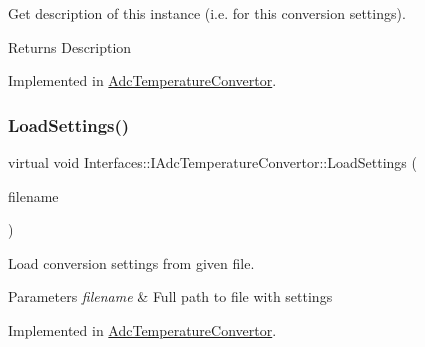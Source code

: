 Get description of this instance (i.\+e. for this conversion settings). 

\begin{DoxyReturn}{Returns}
Description 
\end{DoxyReturn}


Implemented in \hyperlink{class_adc_temperature_convertor_ad82afdddbac46a95b6da44e769180d10}{Adc\+Temperature\+Convertor}.

\mbox{\label{class_interfaces_1_1_i_adc_temperature_convertor_a9697a0319f82ebd1fc20f5e24d3b191c}} 
\subsubsection{\texorpdfstring{Load\+Settings()}{LoadSettings()}}
{\footnotesize\ttfamily virtual void Interfaces\+::\+I\+Adc\+Temperature\+Convertor\+::\+Load\+Settings (\begin{DoxyParamCaption}\item[{Q\+String}]{filename }\end{DoxyParamCaption})\hspace{0.3cm}{\ttfamily [pure virtual]}}



Load conversion settings from given file. 


\begin{DoxyParams}{Parameters}
{\em filename} & Full path to file with settings \\
\hline
\end{DoxyParams}


Implemented in \hyperlink{class_adc_temperature_convertor_affab0a66a3508e2eedd8bab3407ae80f}{Adc\+Temperature\+Convertor}.

\mbox{\label{class_interfaces_1_1_i_adc_temperature_convertor_a6631e979e067ab78d3e5c337449876ac}} 
